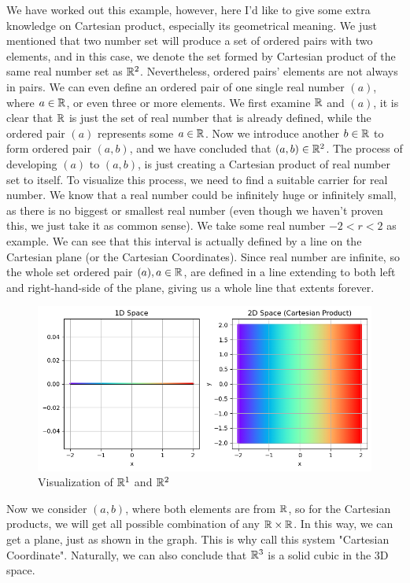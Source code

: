	    
		We have worked out this example, however, here I'd like to give some extra knowledge on Cartesian product, especially its geometrical meaning. We just mentioned that two number set 
		will produce a set of ordered pairs with two elements, and in this case, we denote the set formed by Cartesian product of the same real number set as $\mathbb{R}^2$. Nevertheless, ordered pairs'
		elements are not always in pairs. We can even define an ordered pair of one single real number $(a)$, where $a \in \mathbb{R}$, or even three or more elements. We first examine $\mathbb{R}$ and $(a)$, 
		it is clear that $\mathbb{R}$ is just the set of real number that is already defined, while the ordered pair $(a)$ represents some $a\in \mathbb{R}$. Now we introduce another $b\in \mathbb{R}$ to
		form ordered pair $(a,b)$, and we have concluded that $(a,b) \in \mathbb{R}^2$. The process of developing $(a)$ to $(a,b)$,  is just creating a Cartesian product of real number set 
		to itself. To visualize this process, we need to find a suitable carrier for real number. We know that a real number could be infinitely huge or infinitely small, as there is no
		biggest or smallest real number (even though we haven't proven this, we just take it as common sense). We take some real number $-2 <r < 2$ as example. We can see that this interval is
		actually defined by a line on the Cartesian plane (or the Cartesian Coordinates). Since real number are infinite, so the whole set ordered pair $(a), a\in \mathbb{R}$, are defined in a line
		extending to both left and right-hand-side of the plane, giving us a whole line that extents forever.
		\begin{figure}[H]
			\centering
			\includegraphics[width=0.8\linewidth]{Images/R^2}
			\caption{Visualization of $\mathbb{R}^1$ and $\mathbb{R}^2$}
			\label{fig:r2}
		\end{figure}
		Now we consider $(a,b)$, where both elements are from $\mathbb{R}$, so for the Cartesian products, we will get all possible combination of any $\mathbb{R}\times \mathbb{R}$. In this way, we can get a plane, just as
		shown in the graph. This is why call this system "Cartesian Coordinate". Naturally, we can also conclude that $\mathbb{R}^3 $ is a solid cubic in the 3D space.
